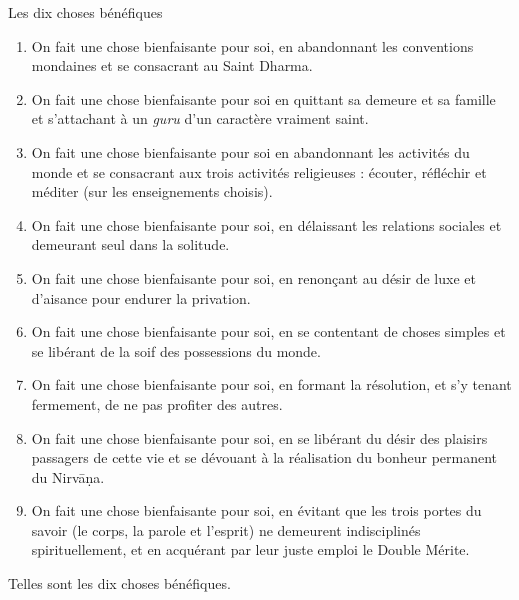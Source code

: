 \documentclass[10pt]{book}
\makeatletter
\renewcommand{\section}{\@startsection{section}{0}{0mm}
   {\baselineskip}
   {\baselineskip}{\normalfont\normalsize\scshape\centering}
}
\makeatother
\begin{document}
\section{Les dix choses bénéfiques}
\begin{enumerate}[1.-]
\item On fait une chose bienfaisante pour soi, en abandonnant les conventions mondaines et se consacrant au Saint Dharma.
\item On fait une chose bienfaisante pour soi en quittant sa demeure et sa famille et s'attachant à un \textit{guru} d'un caractère vraiment saint.
\item On fait une chose bienfaisante pour soi en abandonnant les activités du monde et se consacrant aux trois activités religieuses : écouter, réfléchir et méditer (sur les enseignements choisis).
\item On fait une chose bienfaisante pour soi, en délaissant les relations sociales et demeurant seul dans la solitude.
\item On fait une chose bienfaisante pour soi, en renonçant au désir de luxe et d'aisance pour endurer la privation.
\item On fait une chose bienfaisante pour soi, en se contentant de choses simples et se libérant de la soif des possessions du monde.
\item On fait une chose bienfaisante pour soi, en formant la résolution, et s'y tenant fermement, de ne pas profiter des autres.
\item On fait une chose bienfaisante pour soi, en se libérant du désir des plaisirs passagers de cette vie et se dévouant à la réalisation du bonheur permanent du Nirvāṇa.
\item On fait une chose bienfaisante pour soi, en évitant que les trois portes du savoir (le corps, la parole et l'esprit) ne demeurent indisciplinés spirituellement, et en acquérant par leur juste emploi le Double Mérite.
\end{enumerate}
Telles sont les dix choses bénéfiques.
\end{document}
